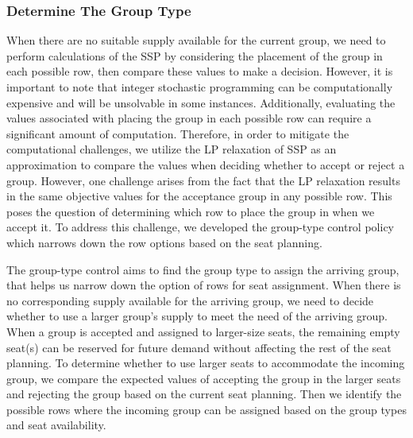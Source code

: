 \subsubsection{Determine The Group Type}\label{nested_policy}

When there are no suitable supply available for the current group, we need to perform calculations of the SSP by considering the placement of the group in each possible row, then compare these values to make a decision. However, it is important to note that integer stochastic programming can be computationally expensive and will be unsolvable in some instances. Additionally, evaluating the values associated with placing the group in each possible row can require a significant amount of computation. Therefore, in order to mitigate the computational challenges, we utilize the LP relaxation of SSP as an approximation to compare the values when deciding whether to accept or reject a group. However, one challenge arises from the fact that the LP relaxation results in the same objective values for the acceptance group in any possible row. This poses the question of determining which row to place the group in when we accept it. To address this challenge, we developed the group-type control policy which narrows down the row options based on the seat planning.

The group-type control aims to find the group type to assign the arriving group, that helps us narrow down the option of rows for seat assignment. When there is no corresponding supply available for the arriving group, we need to decide whether to use a larger group's supply to meet the need of the arriving group. When a group is accepted and assigned to larger-size seats, the remaining empty seat(s) can be reserved for future demand without affecting the rest of the seat planning. To determine whether to use larger seats to accommodate the incoming group, we compare the expected values of accepting the group in the larger seats and rejecting the group based on the current seat planning. Then we identify the possible rows where the incoming group can be assigned based on the group types and seat availability.



